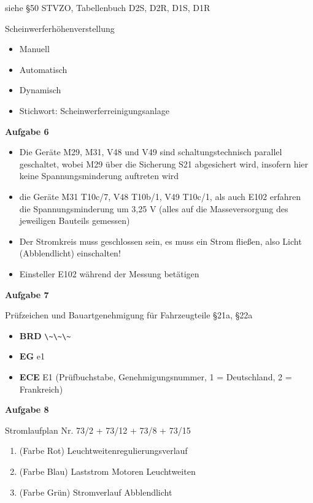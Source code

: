 siehe §50 STVZO, Tabellenbuch D2S, D2R, D1S, D1R

Scheinwerferhöhenverstellung

\begin{itemize}
\item
  Manuell
\item
  Automatisch
\item
  Dynamisch
\item
  Stichwort: Scheinwerferreinigungsanlage
\end{itemize}

\textbf{Aufgabe 6}

\begin{itemize}
\item
  Die Geräte M29, M31, V48 und V49 sind schaltungstechnisch parallel
  geschaltet, wobei M29 über die Sicherung S21 abgesichert wird,
  insofern hier keine Spannungsminderung auftreten wird
\item
  die Geräte M31 T10c/7, V48 T10b/1, V49 T10c/1, als auch E102 erfahren
  die Spannungsminderung um 3,25 V (alles auf die Masseversorgung des
  jeweiligen Bauteils gemessen)
\item
  Der Stromkreis muss geschlossen sein, es muss ein Strom fließen, also
  Licht (Abblendlicht) einschalten!
\item
  Einsteller E102 während der Messung betätigen
\end{itemize}

\textbf{Aufgabe 7}

Prüfzeichen und Bauartgenehmigung für Fahrzeugteile §21a, §22a

\begin{itemize}
\item
  \textbf{BRD} \verb|\~\~\~|
\item
  \textbf{EG} e1
\item
  \textbf{ECE} E1 (Prüfbuchstabe, Genehmigungsnummer, 1 = Deutschland, 2
  = Frankreich)
\end{itemize}

\textbf{Aufgabe 8}

Stromlaufplan Nr. 73/2 + 73/12 + 73/8 + 73/15

\begin{enumerate}
\item
  (Farbe Rot) Leuchtweitenregulierungsverlauf
\item
  (Farbe Blau) Laststrom Motoren Leuchtweiten
\item
  (Farbe Grün) Stromverlauf Abblendlicht
\end{enumerate}


